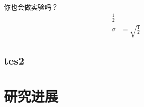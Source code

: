 你也会做实验吗？
\begin{align}
	\frac{1}{2} \tag{1-1}                   \\
	\sigma & = \sqrt{\frac{1}{2}} \tag{1-2}
\end{align}
\subsection{tes2}
\section{研究进展}


